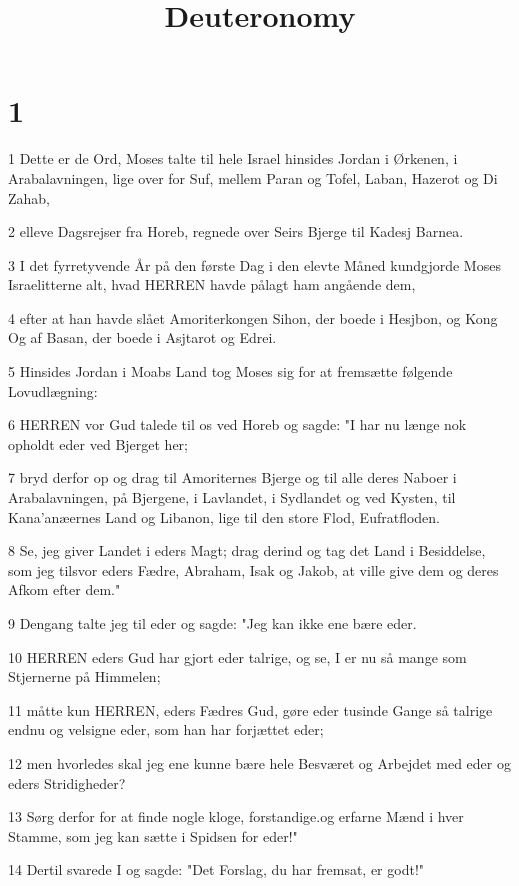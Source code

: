 

\title{Deuteronomy}


\chapter{1}

\par 1 Dette er de Ord, Moses talte til hele Israel hinsides Jordan i Ørkenen, i Arabalavningen, lige over for Suf, mellem Paran og Tofel, Laban, Hazerot og Di Zahab,
\par 2 elleve Dagsrejser fra Horeb, regnede over Seirs Bjerge til Kadesj Barnea.
\par 3 I det fyrretyvende År på den første Dag i den elevte Måned kundgjorde Moses Israelitterne alt, hvad HERREN havde pålagt ham angående dem,
\par 4 efter at han havde slået Amoriterkongen Sihon, der boede i Hesjbon, og Kong Og af Basan, der boede i Asjtarot og Edrei.
\par 5 Hinsides Jordan i Moabs Land tog Moses sig for at fremsætte følgende Lovudlægning:
\par 6 HERREN vor Gud talede til os ved Horeb og sagde: "I har nu længe nok opholdt eder ved Bjerget her;
\par 7 bryd derfor op og drag til Amoriternes Bjerge og til alle deres Naboer i Arabalavningen, på Bjergene, i Lavlandet, i Sydlandet og ved Kysten, til Kana'anæernes Land og Libanon, lige til den store Flod, Eufratfloden.
\par 8 Se, jeg giver Landet i eders Magt; drag derind og tag det Land i Besiddelse, som jeg tilsvor eders Fædre, Abraham, Isak og Jakob, at ville give dem og deres Afkom efter dem."
\par 9 Dengang talte jeg til eder og sagde: "Jeg kan ikke ene bære eder.
\par 10 HERREN eders Gud har gjort eder talrige, og se, I er nu så mange som Stjernerne på Himmelen;
\par 11 måtte kun HERREN, eders Fædres Gud, gøre eder tusinde Gange så talrige endnu og velsigne eder, som han har forjættet eder;
\par 12 men hvorledes skal jeg ene kunne bære hele Besværet og Arbejdet med eder og eders Stridigheder?
\par 13 Sørg derfor for at finde nogle kloge, forstandige.og erfarne Mænd i hver Stamme, som jeg kan sætte i Spidsen for eder!"
\par 14 Dertil svarede I og sagde: "Det Forslag, du har fremsat, er godt!"
